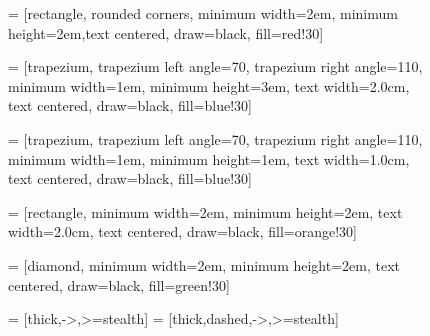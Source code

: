 \begin{figure}[!ht]
  \centering

 = [rectangle, rounded corners, minimum width=2em, minimum height=2em,text centered, draw=black, fill=red!30]

 = [trapezium, trapezium left angle=70, trapezium right angle=110, minimum width=1em, minimum height=3em, text width=2.0cm, text centered, draw=black, fill=blue!30]

 = [trapezium, trapezium left angle=70, trapezium right angle=110, minimum width=1em, minimum height=1em, text width=1.0cm, text centered, draw=black, fill=blue!30]

 = [rectangle, minimum width=2em, minimum height=2em, text width=2.0cm, text centered, draw=black, fill=orange!30]

 = [diamond, minimum width=2em, minimum height=2em, text centered, draw=black, fill=green!30]

 = [thick,->,>=stealth]
 = [thick,dashed,->,>=stealth]

\end{figure}
